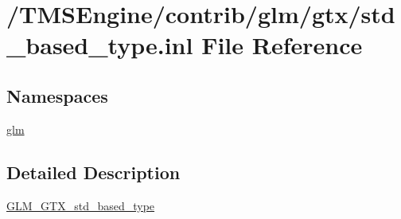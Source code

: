 \hypertarget{std__based__type_8inl}{}\section{/\+T\+M\+S\+Engine/contrib/glm/gtx/std\+\_\+based\+\_\+type.inl File Reference}
\label{std__based__type_8inl}
\subsection*{Namespaces}
\begin{DoxyCompactItemize}
\item 
 \hyperlink{namespaceglm}{glm}
\end{DoxyCompactItemize}


\subsection{Detailed Description}
\hyperlink{group__gtx__std__based__type}{G\+L\+M\+\_\+\+G\+T\+X\+\_\+std\+\_\+based\+\_\+type} 